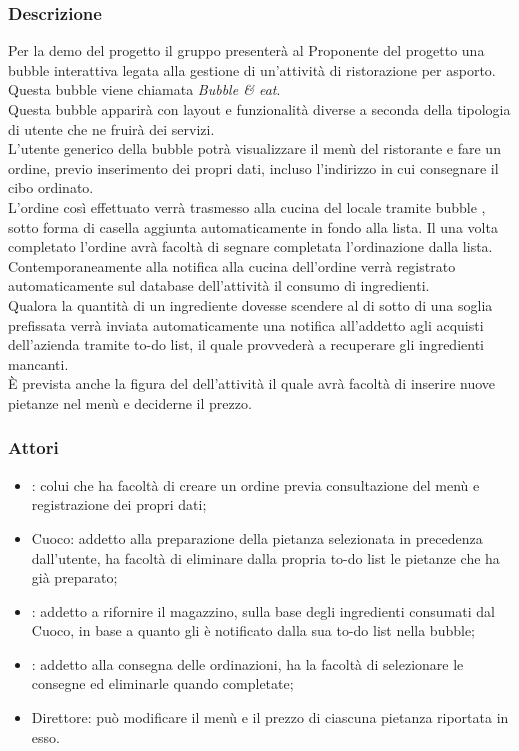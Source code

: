 \subsubsection{Descrizione}
Per la demo del progetto il gruppo \GroupName{} presenterà al Proponente del progetto una bubble interattiva legata alla gestione di un'attività di ristorazione per asporto. Questa bubble viene chiamata \textit{Bubble \& eat}.
\\Questa bubble apparirà con layout e funzionalità diverse a seconda della tipologia di utente che ne fruirà dei servizi.
\\L'utente generico della bubble potrà visualizzare il menù del ristorante e fare un ordine, previo inserimento dei propri dati, incluso l'indirizzo in cui consegnare il cibo ordinato.
\\L'ordine così effettuato verrà trasmesso alla cucina del locale tramite bubble , sotto forma di casella aggiunta automaticamente in fondo alla lista. Il  una volta completato l'ordine avrà facoltà di segnare completata l'ordinazione dalla lista.
\\Contemporaneamente alla notifica alla cucina dell'ordine verrà registrato automaticamente sul database dell'attività il consumo di ingredienti.
\\Qualora la quantità di un ingrediente dovesse scendere al di sotto di una soglia prefissata verrà inviata automaticamente una notifica all'addetto agli acquisti dell'azienda tramite to-do list, il quale provvederà a recuperare gli ingredienti mancanti.
\\È prevista anche la figura del  dell'attività il quale avrà facoltà di inserire nuove pietanze nel menù e deciderne il prezzo.

\subsubsection{Attori}
\begin{itemize}
	\item {}: colui che ha facoltà di creare un ordine previa consultazione del menù e registrazione dei propri dati;
	\item Cuoco: addetto alla preparazione della pietanza selezionata in precedenza dall'utente, ha facoltà di eliminare dalla propria to-do list le pietanze che ha già preparato;
	\item {}: addetto a rifornire il magazzino, sulla base degli ingredienti consumati dal Cuoco, in base a quanto gli è notificato dalla sua to-do list nella bubble;
	\item {}: addetto alla consegna delle ordinazioni, ha la facoltà di selezionare le consegne ed eliminarle quando completate;
	\item Direttore: può modificare il menù e il prezzo di ciascuna pietanza riportata in esso.
\end{itemize}


